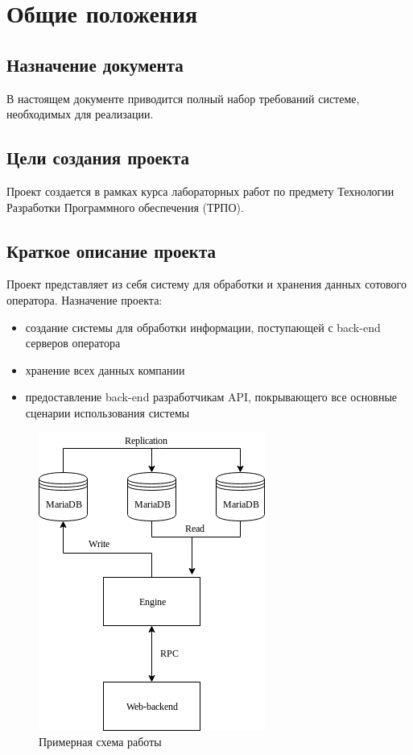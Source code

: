 \section{Общие положения}
\subsection{Назначение документа}
В настоящем документе приводится полный набор требований системе, необходимых для реализации.

\subsection{Цели создания проекта}
Проект создается в рамках курса лабораторных работ по предмету Технологии Разработки Программного обеспечения (ТРПО).

\subsection{Краткое описание проекта}
Проект представляет из себя систему для обработки и хранения данных сотового оператора.
Назначение проекта:
\begin{itemize}
    \item создание системы для обработки информации, поступающей с back-end серверов оператора
    \item хранение всех данных компании
    \item предоставление back-end разработчикам API, покрывающего все основные сценарии использования системы
\end{itemize}

\begin{figure}[H]
    \centering
    \includegraphics[scale=0.8]{pics/general.png}
    \caption{Примерная схема работы}
\end{figure}

\newpage

